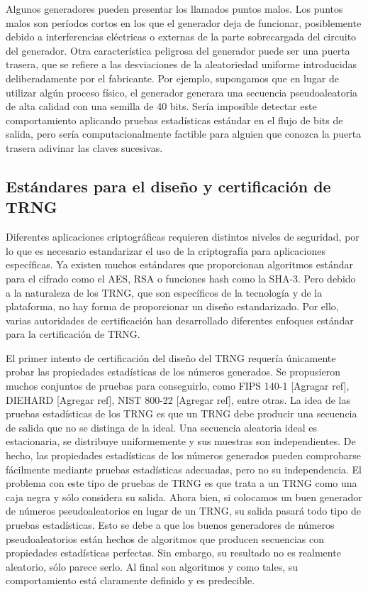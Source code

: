	Algunos generadores pueden presentar los llamados puntos malos. Los puntos malos son períodos cortos en los que el generador deja de funcionar, posiblemente debido a interferencias eléctricas o externas de la parte sobrecargada del circuito del generador. Otra característica peligrosa del generador puede ser una puerta trasera, que se refiere a las desviaciones de la aleatoriedad uniforme introducidas deliberadamente por el fabricante. Por ejemplo, supongamos que en lugar de utilizar algún proceso físico, el generador generara una secuencia pseudoaleatoria de alta calidad con una semilla de 40 bits. Sería imposible detectar este comportamiento aplicando pruebas estadísticas estándar en el flujo de bits de salida, pero sería computacionalmente factible para alguien que conozca la puerta trasera adivinar las claves sucesivas.
	
	
		\subsection{Estándares para el diseño y certificación de TRNG}
	
	Diferentes aplicaciones criptográficas requieren distintos niveles de seguridad, por lo que es necesario estandarizar el uso de la criptografía para aplicaciones específicas. Ya existen muchos estándares que proporcionan algoritmos estándar para el cifrado como el AES, RSA o funciones hash como la SHA-3. Pero debido a la naturaleza de los TRNG, que son específicos de la tecnología y de la plataforma, no hay forma de proporcionar un diseño estandarizado. Por ello, varias autoridades de certificación han desarrollado diferentes enfoques estándar para la certificación de TRNG.
	
	El primer intento de certificación del diseño del TRNG requería únicamente probar las propiedades estadísticas de los números generados. Se propusieron muchos conjuntos de pruebas para conseguirlo, como FIPS 140-1 [Agragar ref], DIEHARD [Agregar ref], NIST 800-22 [Agregar ref], entre otras. La idea de las pruebas estadísticas de los TRNG es que un TRNG debe producir una secuencia de salida que no se distinga de la ideal. Una secuencia aleatoria ideal es estacionaria, se distribuye uniformemente y sus muestras son independientes. De hecho, las propiedades estadísticas de los números generados pueden comprobarse fácilmente mediante pruebas estadísticas adecuadas, pero no su independencia. El problema con este tipo de pruebas de TRNG es que trata a un TRNG como una caja negra y sólo considera su salida. Ahora bien, si colocamos un buen generador de números pseudoaleatorios en lugar de un TRNG, su salida pasará todo tipo de pruebas estadísticas. Esto se debe a que los buenos generadores de números pseudoaleatorios están hechos de algoritmos que producen secuencias con propiedades estadísticas perfectas. Sin embargo, su resultado no es realmente aleatorio, sólo parece serlo. Al final son algoritmos y como tales, su comportamiento está claramente definido y es predecible.
	
